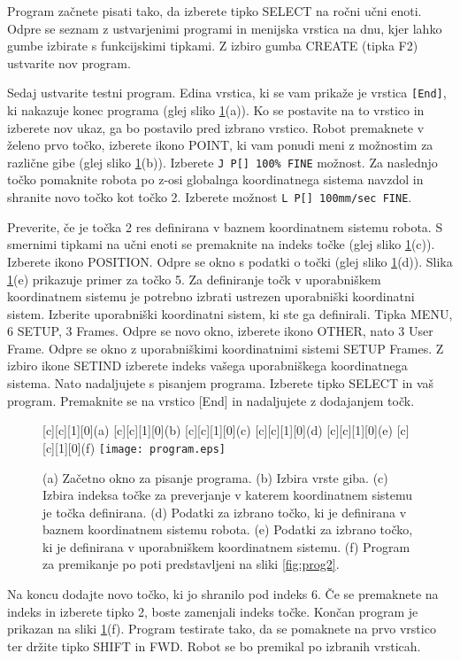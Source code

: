 Program začnete pisati tako, da izberete tipko SELECT na ročni učni enoti. Odpre se seznam z ustvarjenimi programi in menijska vrstica na dnu, kjer lahko gumbe izbirate s funkcijskimi tipkami. Z izbiro gumba CREATE (tipka F2) ustvarite nov program. 

Sedaj ustvarite testni program. Edina vrstica, ki se vam prikaže je vrstica \verb|[End]|, ki nakazuje konec programa (glej sliko \ref{fig:program}(a)). Ko se postavite na to vrstico in izberete nov ukaz, ga bo postavilo pred izbrano vrstico. Robot premaknete v želeno prvo točko, izberete ikono POINT, ki vam ponudi meni z možnostim za različne gibe (glej sliko \ref{fig:program}(b)). Izberete \verb|J P[] 100% FINE| možnost. Za naslednjo točko pomaknite robota po z-osi globalnga koordinatnega sistema navzdol in shranite novo točko kot točko 2. Izberete možnost \verb|L P[] 100mm/sec FINE|.

Preverite, če je točka 2 res definirana v baznem koordinatnem sistemu robota. S smernimi tipkami na učni enoti se premaknite na indeks točke (glej sliko \ref{fig:program}(c)). Izberete ikono POSITION. Odpre se okno s podatki o točki (glej sliko \ref{fig:program}(d)). Slika \ref{fig:program}(e) prikazuje primer za točko 5. Za definiranje točk v uporabniškem koordinatnem sistemu je potrebno izbrati ustrezen uporabniški koordinatni sistem. Izberite uporabniški koordinatni sistem, ki ste ga definirali. Tipka MENU, 6  SETUP, 3 Frames. Odpre se novo okno, izberete ikono OTHER, nato 3  User Frame. Odpre se okno z uporabniškimi koordinatnimi sistemi SETUP Frames. Z izbiro ikone SETIND izberete indeks vašega uporabniškega koordinatnega sistema. Nato nadaljujete s pisanjem programa. Izberete tipko SELECT in vaš program. Premaknite se na vrstico [End] in nadaljujete z dodajanjem točk. 

\begin{figure}[!hbt]
	\centering
	[c][1][0]{(a)}
	[c][1][0]{(b)}		
	[c][1][0]{(c)}
	[c][1][0]{(d)}
	[c][1][0]{(e)}	
	[c][1][0]{(f)}			
	\texttt{[image: program.eps]}
	\caption{(a) Začetno okno za pisanje programa. (b) Izbira vrste giba. (c) Izbira indeksa točke za preverjanje v katerem koordinatnem sistemu je točka definirana. (d) Podatki za izbrano točko, ki je definirana v baznem koordinatnem sistemu robota. (e) Podatki za izbrano točko, ki je definirana v uporabniškem koordinatnem sistemu. (f) Program za premikanje po poti predstavljeni na sliki \ref{fig:prog2}.}
	\label{fig:program}
\end{figure}

Na koncu dodajte novo točko, ki jo shranilo pod indeks 6. Če se premaknete na indeks in izberete tipko 2, boste zamenjali indeks točke. Končan program je prikazan na sliki \ref{fig:program}(f). Program testirate tako, da se pomaknete na prvo vrstico ter držite tipko SHIFT in FWD. Robot se bo premikal po izbranih vrsticah.
